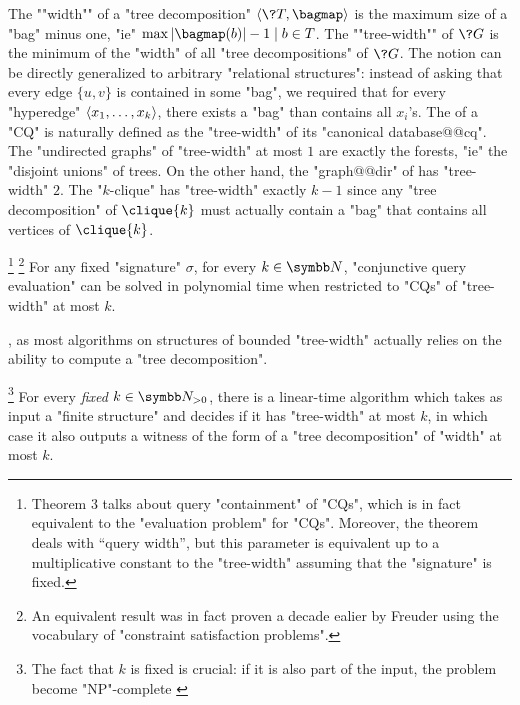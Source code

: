 The \AP""width"" of a "tree decomposition" $\tup{\?T, \bagmap}$ is the maximum size of a "bag" minus one, "ie" $\max{|\bagmap(b)|-1 \mid b\in T}$.
The \AP""tree-width"" of $\?G$ is the minimum of the "width" of all "tree decompositions" of $\?G$. 
The notion can be directly generalized to arbitrary "relational structures":
instead of asking that every edge $\{u,v\}$ is contained in some "bag",
we required that for every "hyperedge" $\langle x_1,\dotsc,x_k\rangle$,
there exists a "bag" than contains all $x_i$'s.
The  of a "CQ" is naturally defined as
the "tree-width" of its "canonical database@@cq".
The "undirected graphs" of "tree-width" at most $1$ are exactly
the forests, "ie" the "disjoint unions" of trees.
On the other hand, the "graph@@dir" of  has "tree-width" $2$.
The "$k$-clique" has "tree-width" exactly $k-1$ since any "tree decomposition"
of $\clique{k}$ must actually contain a "bag" that contains all vertices of $\clique{k}$.

\begin{proposition}
	\!\footnote{Theorem 3 talks about query "containment" of "CQs", which is in fact equivalent
	to the "evaluation problem" for "CQs". Moreover, the theorem deals with ``query width'',
	but this parameter is equivalent up to a multiplicative constant to the "tree-width"
	\cite[Lemma~2]{ChekuriRajaraman2000Containment} assuming that the "signature" is fixed.} 
	\footnote{An equivalent result was in fact proven a decade ealier
	by Freuder \cite[Theorem~3]{Freuder1990Complexity} using the
	vocabulary of "constraint satisfaction problems".}
	\AP\label{prop:eval-CQ-bounded-tw}
	For any fixed "signature" $\sigma$,
	for every $k\in\N$, "conjunctive query evaluation" can
	be solved in polynomial time when restricted to "CQs" of
	"tree-width" at most $k$.
\end{proposition}

, as most algorithms on structures of
bounded "tree-width" actually relies on the ability to compute
a "tree decomposition".
\begin{proposition}
	\!\footnote{The fact that $k$ is fixed is crucial: if it is also
	part of the input, the problem become "NP"-complete
	\cite[Theorem~3.3]{ArnborgCorneilProskurowski1987Complexity}}
	\label{prop:bodlaender}
	For every \emph{fixed} $k\in\Np$, there is a linear-time algorithm
	which takes as input a "finite structure" and decides
	if it has "tree-width" at most $k$, in which case it also
	outputs a witness of the form of a "tree decomposition" of "width" at most $k$. 
\end{proposition}


